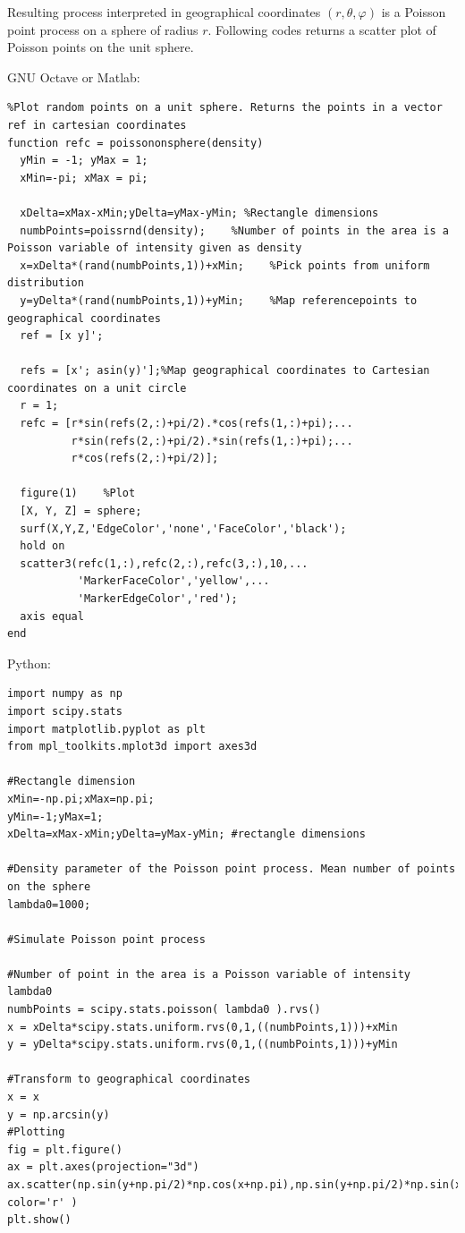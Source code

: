 \documentclass{article}
\begin{document}
        Resulting process interpreted in geographical coordinates $(r,\theta,\varphi)$ is a Poisson point process on a sphere of radius $r$.  Following codes returns a scatter plot of Poisson points on the unit sphere.



        GNU Octave or Matlab:
\begin{verbatim}
%Plot random points on a unit sphere. Returns the points in a vector ref in cartesian coordinates
function refc = poissononsphere(density)
  yMin = -1; yMax = 1;
  xMin=-pi; xMax = pi;
  
  xDelta=xMax-xMin;yDelta=yMax-yMin; %Rectangle dimensions
  numbPoints=poissrnd(density);    %Number of points in the area is a Poisson variable of intensity given as density
  x=xDelta*(rand(numbPoints,1))+xMin;    %Pick points from uniform distribution
  y=yDelta*(rand(numbPoints,1))+yMin;    %Map referencepoints to geographical coordinates
  ref = [x y]';

  refs = [x'; asin(y)'];%Map geographical coordinates to Cartesian coordinates on a unit circle
  r = 1;
  refc = [r*sin(refs(2,:)+pi/2).*cos(refs(1,:)+pi);...
          r*sin(refs(2,:)+pi/2).*sin(refs(1,:)+pi);...
          r*cos(refs(2,:)+pi/2)];

  figure(1)    %Plot
  [X, Y, Z] = sphere;
  surf(X,Y,Z,'EdgeColor','none','FaceColor','black');
  hold on
  scatter3(refc(1,:),refc(2,:),refc(3,:),10,...
           'MarkerFaceColor','yellow',...
           'MarkerEdgeColor','red');
  axis equal
end
\end{verbatim}

Python:

\begin{verbatim}
import numpy as np
import scipy.stats
import matplotlib.pyplot as plt
from mpl_toolkits.mplot3d import axes3d

#Rectangle dimension
xMin=-np.pi;xMax=np.pi;
yMin=-1;yMax=1;
xDelta=xMax-xMin;yDelta=yMax-yMin; #rectangle dimensions

#Density parameter of the Poisson point process. Mean number of points on the sphere
lambda0=1000; 

#Simulate Poisson point process

#Number of point in the area is a Poisson variable of intensity lambda0
numbPoints = scipy.stats.poisson( lambda0 ).rvs()
x = xDelta*scipy.stats.uniform.rvs(0,1,((numbPoints,1)))+xMin
y = yDelta*scipy.stats.uniform.rvs(0,1,((numbPoints,1)))+yMin

#Transform to geographical coordinates
x = x
y = np.arcsin(y)
#Plotting
fig = plt.figure()
ax = plt.axes(projection="3d")
ax.scatter(np.sin(y+np.pi/2)*np.cos(x+np.pi),np.sin(y+np.pi/2)*np.sin(x+np.pi),np.cos(y+np.pi/2), color='r' )
plt.show()

\end{verbatim}
\end{document}
